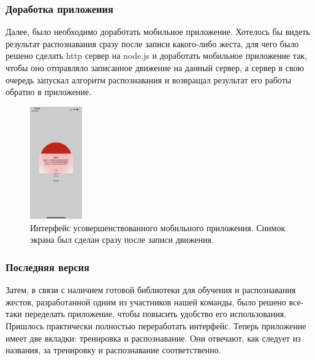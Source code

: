 \subsubsection{Доработка приложения }
Далее, было необходимо доработать мобильное приложение. Хотелось бы видеть результат распознавания сразу после записи какого-либо жеста, для чего было решено сделать http сервер на node.js и доработать мобильное приложение так, чтобы оно отправляло записанное движение на данный сервер, а сервер в свою очередь запускал алгоритм распознавания и возвращал результат его работы обратно в приложение.
\begin{figure}[H]
    \begin{center}
        \includegraphics[width=0.2\textwidth]{max_kt2_images/image5.jpg}
    \end{center}
    \caption{Интерфейс усовершенствованного мобильного приложения. Снимок экрана был сделан сразу после записи движения.}
\end{figure}

\subsubsection{Последняя версия}
Затем, в связи с наличием готовой библиотеки для обучения и распознавания жестов, разработанной одним из участников нашей команды, было решено все-таки переделать приложение, чтобы повысить удобство его использования. Пришлось практически полностью переработать интерфейс. Теперь приложение имеет две вкладки: тренировка и распознавание. Они отвечают, как следует из названия, за тренировку и распознавание соответственно.

